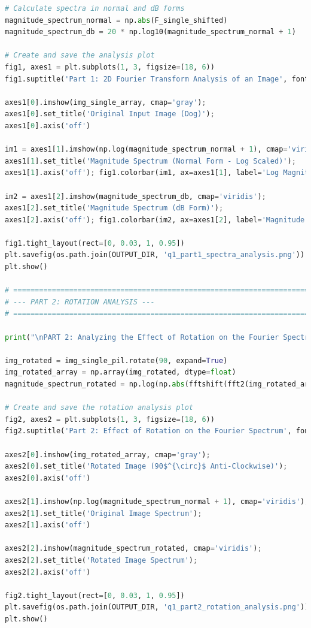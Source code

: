 \documentclass[11pt, a4paper]{article}
\begin{document}
\begin{lstlisting}[language=Python, caption={Python script for Question 1.}]
# Calculate spectra in normal and dB forms
magnitude_spectrum_normal = np.abs(F_single_shifted)
magnitude_spectrum_db = 20 * np.log10(magnitude_spectrum_normal + 1)

# Create and save the analysis plot
fig1, axes1 = plt.subplots(1, 3, figsize=(18, 6))
fig1.suptitle('Part 1: 2D Fourier Transform Analysis of an Image', fontsize=16)

axes1[0].imshow(img_single_array, cmap='gray'); 
axes1[0].set_title('Original Input Image (Dog)'); 
axes1[0].axis('off')

im1 = axes1[1].imshow(np.log(magnitude_spectrum_normal + 1), cmap='viridis'); 
axes1[1].set_title('Magnitude Spectrum (Normal Form - Log Scaled)'); 
axes1[1].axis('off'); fig1.colorbar(im1, ax=axes1[1], label='Log Magnitude')

im2 = axes1[2].imshow(magnitude_spectrum_db, cmap='viridis'); 
axes1[2].set_title('Magnitude Spectrum (dB Form)'); 
axes1[2].axis('off'); fig1.colorbar(im2, ax=axes1[2], label='Magnitude (dB)')

fig1.tight_layout(rect=[0, 0.03, 1, 0.95])
plt.savefig(os.path.join(OUTPUT_DIR, 'q1_part1_spectra_analysis.png'))
plt.show()

# ============================================================================
# --- PART 2: ROTATION ANALYSIS ---
# ============================================================================

print("\nPART 2: Analyzing the Effect of Rotation on the Fourier Spectrum...")

img_rotated = img_single_pil.rotate(90, expand=True)
img_rotated_array = np.array(img_rotated, dtype=float)
magnitude_spectrum_rotated = np.log(np.abs(fftshift(fft2(img_rotated_array))) + 1)

# Create and save the rotation analysis plot
fig2, axes2 = plt.subplots(1, 3, figsize=(18, 6))
fig2.suptitle('Part 2: Effect of Rotation on the Fourier Spectrum', fontsize=16)

axes2[0].imshow(img_rotated_array, cmap='gray'); 
axes2[0].set_title('Rotated Image (90$^{\circ}$ Anti-Clockwise)'); 
axes2[0].axis('off')

axes2[1].imshow(np.log(magnitude_spectrum_normal + 1), cmap='viridis'); 
axes2[1].set_title('Original Image Spectrum'); 
axes2[1].axis('off')

axes2[2].imshow(magnitude_spectrum_rotated, cmap='viridis'); 
axes2[2].set_title('Rotated Image Spectrum'); 
axes2[2].axis('off')

fig2.tight_layout(rect=[0, 0.03, 1, 0.95])
plt.savefig(os.path.join(OUTPUT_DIR, 'q1_part2_rotation_analysis.png'))
plt.show()


\end{lstlisting}
\end{document}
